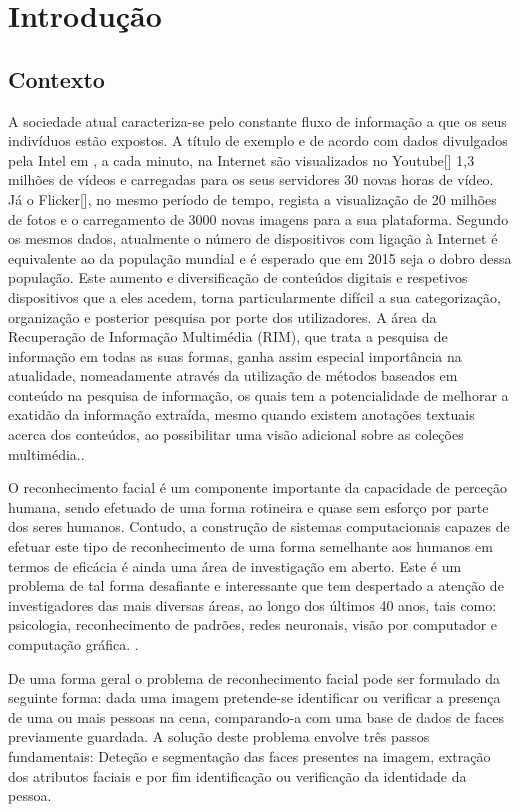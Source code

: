 \chapter{Introdução} \label{chap:intro}

\section{Contexto} \label{sec:context}

A sociedade atual caracteriza-se pelo constante fluxo de informação a que os seus indivíduos estão expostos. A título de exemplo e de acordo com dados divulgados pela Intel em \citep{IntelCorporation}, a cada minuto, na Internet são visualizados no Youtube[] 1,3 milhões de vídeos e carregadas para os seus servidores 30 novas horas de vídeo. Já o Flicker[], no mesmo período de tempo, regista a visualização de 20 milhões de fotos e o carregamento de 3000 novas imagens para a sua plataforma.
Segundo os mesmos dados, atualmente o número de dispositivos com ligação à Internet é equivalente ao da população mundial e é esperado que em 2015 seja o dobro dessa população.
Este aumento e diversificação de conteúdos digitais e respetivos dispositivos que a eles acedem, torna particularmente difícil a sua categorização, organização e posterior pesquisa por porte dos utilizadores. A área da  Recuperação de Informação Multimédia (RIM), que trata a pesquisa de informação em todas as suas formas, ganha assim especial importância na atualidade, nomeadamente através da utilização de métodos baseados em conteúdo na pesquisa de informação, os quais tem a potencialidade de melhorar a exatidão da informação extraída, mesmo quando existem anotações textuais acerca dos conteúdos, ao possibilitar uma visão adicional sobre as coleções multimédia.\citep{Lew2006}.

O reconhecimento facial é um componente importante da capacidade de perceção humana, sendo efetuado de uma forma rotineira e quase sem esforço por parte dos seres humanos. Contudo, a construção de sistemas computacionais capazes de efetuar este tipo de reconhecimento de uma forma semelhante aos humanos em termos de eficácia é ainda uma área de investigação em aberto. Este é um problema de tal forma desafiante e interessante que tem despertado a atenção de investigadores das mais diversas áreas, ao longo dos últimos 40 anos, tais como: psicologia, reconhecimento de padrões, redes neuronais, visão por computador e computação gráfica. \citep{Zhao2003}.

De uma forma geral o problema de reconhecimento facial pode ser formulado da seguinte forma: dada uma imagem pretende-se identificar ou verificar a presença de uma ou mais pessoas na cena, comparando-a com uma base de dados de faces previamente guardada. A solução deste problema envolve três passos fundamentais: Deteção e segmentação das faces presentes na imagem, extração dos atributos faciais e por fim identificação ou verificação da identidade da pessoa.\citep{Zhao2003}
	

